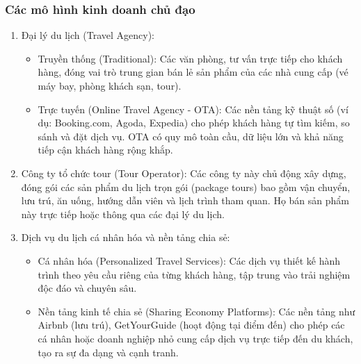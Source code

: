 \subsubsection{Các mô hình kinh doanh chủ đạo}
\begin{enumerate}
    \item Đại lý du lịch (Travel Agency):
        \begin{itemize}
            \item Truyền thống (Traditional): Các văn phòng, tư vấn trực tiếp cho khách hàng, đóng vai trò trung gian bán lẻ sản phẩm của các nhà cung cấp (vé máy bay, phòng khách sạn, tour).
            \item Trực tuyến (Online Travel Agency - OTA): Các nền tảng kỹ thuật số (ví dụ: Booking.com, Agoda, Expedia) cho phép khách hàng tự tìm kiếm, so sánh và đặt dịch vụ. OTA có quy mô toàn cầu, dữ liệu lớn và khả năng tiếp cận khách hàng rộng khắp.
        \end{itemize}
    \item Công ty tổ chức tour (Tour Operator): Các công ty này chủ động xây dựng, đóng gói các sản phẩm du lịch trọn gói (package tours) bao gồm vận chuyển, lưu trú, ăn uống, hướng dẫn viên và lịch trình tham quan. Họ bán sản phẩm này trực tiếp hoặc thông qua các đại lý du lịch.
    \item Dịch vụ du lịch cá nhân hóa và nền tảng chia sẻ:
        \begin{itemize}
            \item Cá nhân hóa (Personalized Travel Services): Các dịch vụ thiết kế hành trình theo yêu cầu riêng của từng khách hàng, tập trung vào trải nghiệm độc đáo và chuyên sâu.
            \item Nền tảng kinh tế chia sẻ (Sharing Economy Platforms): Các nền tảng như Airbnb (lưu trú), GetYourGuide (hoạt động tại điểm đến) cho phép các cá nhân hoặc doanh nghiệp nhỏ cung cấp dịch vụ trực tiếp đến du khách, tạo ra sự đa dạng và cạnh tranh.
        \end{itemize}
\end{enumerate}

